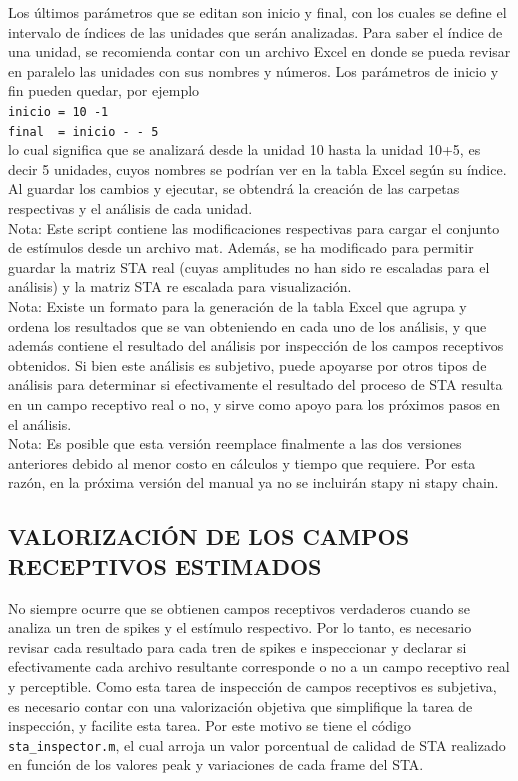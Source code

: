 \documentclass[10pt]{article}
\begin{document}
Los últimos parámetros que se editan son inicio y final, con los cuales se define el intervalo de índices de las unidades que serán analizadas. Para saber el índice de una unidad, se recomienda contar con un archivo Excel en donde se pueda revisar en paralelo las unidades con sus nombres y números. Los parámetros de inicio y fin pueden quedar, por ejemplo \\
\verb+inicio = 10 -1+ \\
\verb+final  = inicio - - 5+ \\
lo cual significa que se analizará desde la unidad 10 hasta la unidad 10+5, es decir 5 unidades, cuyos nombres se podrían ver en la tabla Excel según su índice. Al guardar los cambios y ejecutar, se obtendrá la creación de las carpetas respectivas y el análisis de cada unidad.\\

Nota: Este script contiene las modificaciones respectivas para cargar el conjunto de estímulos desde un archivo mat. Además, se ha modificado para permitir guardar la matriz STA real (cuyas amplitudes no han sido re escaladas para el análisis) y la matriz STA re escalada para visualización. \\

Nota: Existe un formato para la generación de la tabla Excel que agrupa y ordena los resultados que se van obteniendo en cada uno de los análisis, y que además contiene el resultado del análisis por inspección de los campos receptivos obtenidos. Si bien este análisis es subjetivo, puede apoyarse por otros tipos de análisis para determinar si efectivamente el resultado del proceso de STA resulta en un campo receptivo real o no, y sirve como apoyo para los próximos pasos en el análisis. \\

Nota: Es posible que esta versión reemplace finalmente a las dos versiones anteriores debido al menor costo en cálculos y tiempo que requiere. Por esta razón, en la próxima versión del manual ya no se incluirán stapy ni stapy chain.

\newpage

\subsection{ VALORIZACIÓN DE LOS CAMPOS RECEPTIVOS ESTIMADOS }

No siempre ocurre que se obtienen campos receptivos verdaderos cuando se analiza un tren de spikes y el estímulo respectivo. Por lo tanto, es necesario revisar cada resultado para cada tren de spikes e inspeccionar y declarar si efectivamente cada archivo resultante corresponde o no a un campo receptivo real y perceptible. Como esta tarea de inspección de campos receptivos es subjetiva, es necesario contar con una valorización objetiva que simplifique la tarea de inspección, y facilite esta tarea. Por este motivo se tiene el código \verb+sta_inspector.m+, el cual arroja un valor porcentual de calidad de STA realizado en función de los valores peak y variaciones de cada frame del STA.\\
\end{document}
